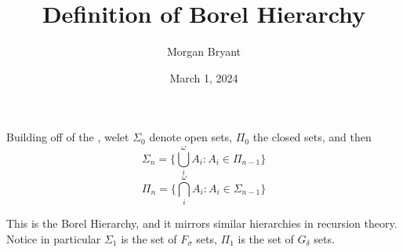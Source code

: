 \documentclass[a4paper]{article}
\title{Definition of Borel Hierarchy}
\date{March 1, 2024}
\author{Morgan Bryant}
\begin{document}
\maketitle
\par{Building off of the , welet \(\Sigma _0\) denote open sets, \(\Pi _0\) the closed sets, and then 
\[\Sigma _n =  \{ \bigcup _i^ \omega  A_i : A_i  \in   \Pi _{n-1} \}\]
\[\Pi _n =  \{ \bigcap _i^ \omega  A_i : A_i  \in   \Sigma _{n-1} \}\]}\par{This is the Borel Hierarchy, and it mirrors similar hierarchies in recursion theory. 
Notice in particular \(\Sigma _1\) is the set of \(F_ \sigma\) sets, \(\Pi _1\) is the set of \(G_ \delta\) sets. }
\printbibliography
\end{document}
